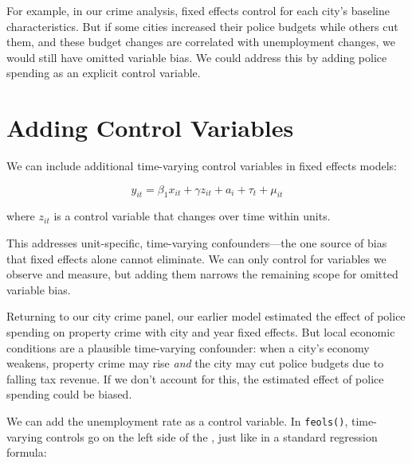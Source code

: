 \documentclass[
  letterpaper,
  DIV=11,
  numbers=noendperiod]{scrreprt}
\begin{document}
For example, in our crime analysis, fixed effects control for each
city's baseline characteristics. But if some cities increased their
police budgets while others cut them, and these budget changes are
correlated with unemployment changes, we would still have omitted
variable bias. We could address this by adding police spending as an
explicit control variable.

\section{Adding Control Variables}\label{adding-control-variables}

We can include additional time-varying control variables in fixed
effects models:

\[
y_{it} = \beta_1 x_{it} + \gamma z_{it} + a_i + \tau_t + \mu_{it}
\]

where \(z_{it}\) is a control variable that changes over time within
units.

This addresses unit-specific, time-varying confounders---the one source
of bias that fixed effects alone cannot eliminate. We can only control
for variables we observe and measure, but adding them narrows the
remaining scope for omitted variable bias.

Returning to our city crime panel, our earlier model estimated the
effect of police spending on property crime with city and year fixed
effects. But local economic conditions are a plausible time-varying
confounder: when a city's economy weakens, property crime may rise
\emph{and} the city may cut police budgets due to falling tax revenue.
If we don't account for this, the estimated effect of police spending
could be biased.

We can add the unemployment rate as a control variable. In
\texttt{feols()}, time-varying controls go on the left side of the
\texttt{\textbar{}}, just like in a standard regression formula:
\end{document}
